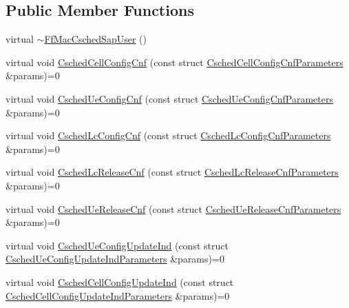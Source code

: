 \subsection*{Public Member Functions}
\begin{DoxyCompactItemize}
\item 
virtual \hyperlink{classns3_1_1FfMacCschedSapUser_a80995244ef0b4d0ee5f2afce37869700}{$\sim$\+Ff\+Mac\+Csched\+Sap\+User} ()
\item 
virtual void \hyperlink{classns3_1_1FfMacCschedSapUser_a451a169e6666c564e8a3eb0c8c3d0e50}{Csched\+Cell\+Config\+Cnf} (const struct \hyperlink{structns3_1_1FfMacCschedSapUser_1_1CschedCellConfigCnfParameters}{Csched\+Cell\+Config\+Cnf\+Parameters} \&params)=0
\item 
virtual void \hyperlink{classns3_1_1FfMacCschedSapUser_aecc852478a4ba7e4cd868dae75e01b68}{Csched\+Ue\+Config\+Cnf} (const struct \hyperlink{structns3_1_1FfMacCschedSapUser_1_1CschedUeConfigCnfParameters}{Csched\+Ue\+Config\+Cnf\+Parameters} \&params)=0
\item 
virtual void \hyperlink{classns3_1_1FfMacCschedSapUser_a85a91455f525ea4883f452f7295cc9e9}{Csched\+Lc\+Config\+Cnf} (const struct \hyperlink{structns3_1_1FfMacCschedSapUser_1_1CschedLcConfigCnfParameters}{Csched\+Lc\+Config\+Cnf\+Parameters} \&params)=0
\item 
virtual void \hyperlink{classns3_1_1FfMacCschedSapUser_a469727524940f4e6509664b05cc05f61}{Csched\+Lc\+Release\+Cnf} (const struct \hyperlink{structns3_1_1FfMacCschedSapUser_1_1CschedLcReleaseCnfParameters}{Csched\+Lc\+Release\+Cnf\+Parameters} \&params)=0
\item 
virtual void \hyperlink{classns3_1_1FfMacCschedSapUser_a0b06e2ed2b408f578c6919c8e8312e73}{Csched\+Ue\+Release\+Cnf} (const struct \hyperlink{structns3_1_1FfMacCschedSapUser_1_1CschedUeReleaseCnfParameters}{Csched\+Ue\+Release\+Cnf\+Parameters} \&params)=0
\item 
virtual void \hyperlink{classns3_1_1FfMacCschedSapUser_a63f3fa5bac0cc7234a17c3241bff6a04}{Csched\+Ue\+Config\+Update\+Ind} (const struct \hyperlink{structns3_1_1FfMacCschedSapUser_1_1CschedUeConfigUpdateIndParameters}{Csched\+Ue\+Config\+Update\+Ind\+Parameters} \&params)=0
\item 
virtual void \hyperlink{classns3_1_1FfMacCschedSapUser_aff980755ebd41156e25261696d4f635b}{Csched\+Cell\+Config\+Update\+Ind} (const struct \hyperlink{structns3_1_1FfMacCschedSapUser_1_1CschedCellConfigUpdateIndParameters}{Csched\+Cell\+Config\+Update\+Ind\+Parameters} \&params)=0
\end{DoxyCompactItemize}


